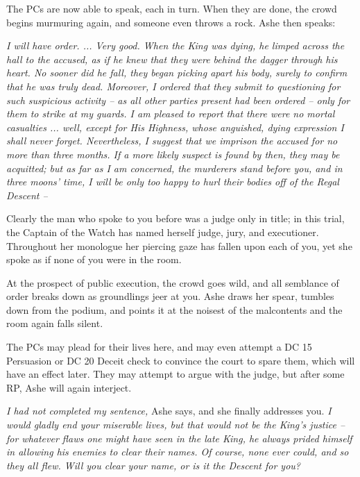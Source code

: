 \documentclass{report}
\theoremstyle{definition}
\begin{document}
The PCs are now able to speak, each in turn. When they are done, the crowd begins murmuring again, and someone even throws a rock. Ashe then speaks:

\begin{displayquote}
\textit{I will have order. ... Very good. When the King was dying, he limped across the hall to the accused, as if he knew that they were behind the dagger through his heart. No sooner did he fall, they began picking apart his body, surely to confirm that he was truly dead. Moreover, I ordered that they submit to questioning for such suspicious activity -- as all other parties present had been ordered -- only for them to strike at my guards. I am pleased to report that there were no mortal casualties ... well, except for His Highness, whose anguished, dying expression I shall never forget. Nevertheless, I suggest that we imprison the accused for no more than three months. If a more likely suspect is found by then, they may be acquitted; but as far as I am concerned, the murderers stand before you, and in three moons' time, I will be only too happy to hurl their bodies off of the Regal Descent --}

Clearly the man who spoke to you before was a judge only in title; in this trial, the Captain of the Watch has named herself judge, jury, and executioner. Throughout her monologue her piercing gaze has fallen upon each of you, yet she spoke as if none of you were in the room.

At the prospect of public execution, the crowd goes wild, and all semblance of order breaks down as groundlings jeer at you. Ashe draws her spear, tumbles down from the podium, and points it at the noisest of the malcontents and the room again falls silent. 
\end{displayquote}

The PCs may plead for their lives here, and may even attempt a DC 15 Persuasion or DC 20 Deceit check to convince the court to spare them, which will have an effect later. They may attempt to argue with the judge, but after some RP, Ashe will again interject.

\begin{displayquote}
\textit{I had not completed my sentence,} Ashe says, and she finally addresses you. \textit{I would gladly end your miserable lives, but that would not be the King's justice -- for whatever flaws one might have seen in the late King, he always prided himself in allowing his enemies to clear their names. Of course, none ever could, and so they all flew. Will you clear your name, or is it the Descent for you?}
\end{displayquote}
\end{document}
